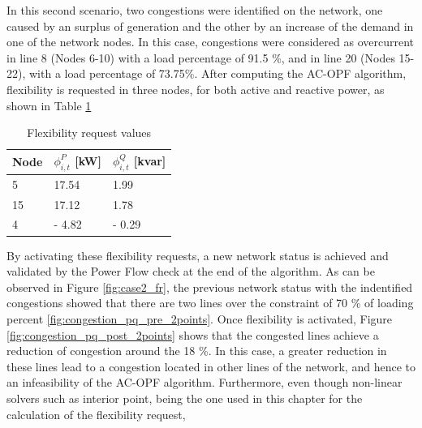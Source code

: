 In this second scenario, two congestions were identified on the network, one caused by an surplus of generation and the other by an increase of the demand in one of the network nodes. In this case, congestions were considered as overcurrent in line 8 (Nodes 6-10) with a load percentage of 91.5 \%, and in line 20 (Nodes 15-22), with a load percentage of 73.75\%. After computing the AC-OPF algorithm, flexibility is requested in three nodes, for both active and reactive power, as shown in Table \ref{tab:FR_case2}

\begin{table}[htbp]
\centering
\caption{Flexibility request values}
\label{tab:FR_case2}
\begin{tabular}{lll} 
\toprule
Node & $\phi_{i,t}^{P}$ [kW] & $\phi_{i,t}^{Q}$ [kvar]  \\ 
\hline
5    & 17.54      & 1.99         \\
15    & 17.12      & 1.78          \\
4    & - 4.82      & - 0.29         \\
\bottomrule
\end{tabular}
\end{table}

By activating these flexibility requests, a new network status is achieved and validated by the Power Flow check at the end of the algorithm. As can be observed in Figure \ref{fig:case2_fr}, the previous network status with the indentified congestions showed that there are two lines over the constraint of 70 \% of loading percent \ref{fig:congestion_pq_pre_2points}. Once flexibility is activated, Figure \ref{fig:congestion_pq_post_2points} shows that the congested lines achieve a reduction of congestion around the 18 \%. In this case, a greater reduction in these lines lead to a congestion located in other lines of the network, and hence to an infeasibility of the AC-OPF algorithm. Furthermore, even though non-linear solvers such as interior point, being the one used in this chapter for the calculation of the flexibility request, 

